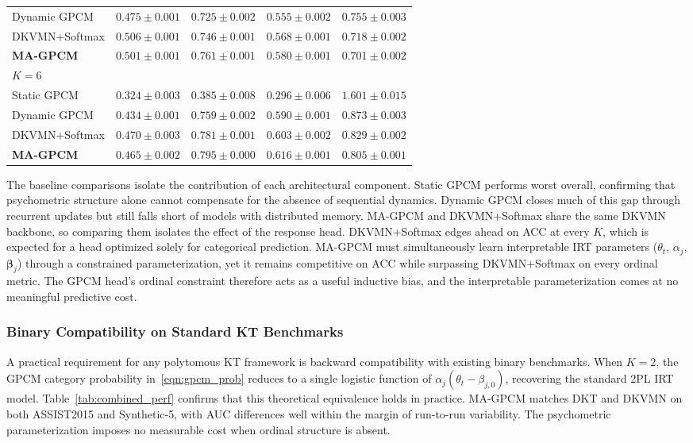 \documentclass[pdflatex,sn-apa]{sn-jnl}
\begin{document}
\begin{table}[htb!]
\begin{tabular}{lcccc}
Dynamic GPCM   & $0.475 \pm 0.001$ & $0.725 \pm 0.002$ & $0.555 \pm 0.002$ & $0.755 \pm 0.003$ \\
DKVMN+Softmax  & $\mathbf{0.506} \pm 0.001$ & $0.746 \pm 0.001$ & $0.568 \pm 0.001$ & $0.718 \pm 0.002$ \\
\textbf{MA-GPCM} & $0.501 \pm 0.001$ & $\mathbf{0.761} \pm 0.001$ & $\mathbf{0.580} \pm 0.001$ & $\mathbf{0.701} \pm 0.002$ \\
\midrule
\multicolumn{5}{l}{$K=6$} \\
\cmidrule(lr){1-5}
Static GPCM    & $0.324 \pm 0.003$ & $0.385 \pm 0.008$ & $0.296 \pm 0.006$ & $1.601 \pm 0.015$ \\
Dynamic GPCM   & $0.434 \pm 0.001$ & $0.759 \pm 0.002$ & $0.590 \pm 0.001$ & $0.873 \pm 0.003$ \\
DKVMN+Softmax  & $\mathbf{0.470} \pm 0.003$ & $0.781 \pm 0.001$ & $0.603 \pm 0.002$ & $0.829 \pm 0.002$ \\
\textbf{MA-GPCM} & $0.465 \pm 0.002$ & $\mathbf{0.795} \pm 0.000$ & $\mathbf{0.616} \pm 0.001$ & $\mathbf{0.805} \pm 0.001$ \\
\bottomrule
\end{tabular}
\end{table}

The baseline comparisons isolate the contribution of each architectural component. Static GPCM performs worst overall, confirming that psychometric structure alone cannot compensate for the absence of sequential dynamics. Dynamic GPCM closes much of this gap through recurrent updates but still falls short of models with distributed memory. MA-GPCM and DKVMN+Softmax share the same DKVMN backbone, so comparing them isolates the effect of the response head. DKVMN+Softmax edges ahead on ACC at every $K$, which is expected for a head optimized solely for categorical prediction. MA-GPCM must simultaneously learn interpretable IRT parameters ($\theta_t$, $\alpha_j$, $\boldsymbol{\beta}_j$) through a constrained parameterization, yet it remains competitive on ACC while surpassing DKVMN+Softmax on every ordinal metric. The GPCM head's ordinal constraint therefore acts as a useful inductive bias, and the interpretable parameterization comes at no meaningful predictive cost.


\subsubsection{Binary Compatibility on Standard KT Benchmarks}
A practical requirement for any polytomous KT framework is backward compatibility with existing binary benchmarks. When $K=2$, the GPCM category probability in~\eqref{eqn:gpcm_prob} reduces to a single logistic function of $\alpha_j(\theta_t - \beta_{j,0})$, recovering the standard 2PL IRT model. Table~\ref{tab:combined_perf} confirms that this theoretical equivalence holds in practice. MA-GPCM matches DKT and DKVMN on both ASSIST2015 and Synthetic-5, with AUC differences well within the margin of run-to-run variability. The psychometric parameterization imposes no measurable cost when ordinal structure is absent.
\end{document}
